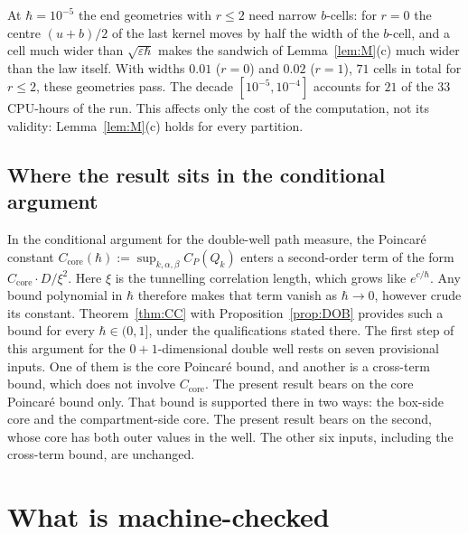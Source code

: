 \documentclass[11pt,a4paper]{article}
\theoremstyle{definition}
\theoremstyle{remark}
\begin{document}
At $\hbar=10^{-5}$ the end geometries with $r\le2$ need narrow $b$-cells: for $r=0$ the centre $(u+b)/2$ of the last kernel moves by half the width of the $b$-cell, and a cell much wider than $\sqrt{\varepsilon\hbar}$ makes the sandwich of Lemma~\ref{lem:M}(c) much wider than the law itself. With widths $0.01$ ($r=0$) and $0.02$ ($r=1$), $71$ cells in total for $r\le2$, these geometries pass. The decade $[10^{-5},10^{-4}]$ accounts for $21$ of the $33$ CPU-hours of the run. This affects only the cost of the computation, not its validity: Lemma~\ref{lem:M}(c) holds for every partition.

\subsection{Where the result sits in the conditional argument}\label{sec:conditional}
In the conditional argument for the double-well path measure, the Poincar\'e constant $C_{\mathrm{core}}(\hbar):=\sup_{k,\alpha,\beta}C_P(Q_k)$ enters a second-order term of the form $C_{\mathrm{core}}\cdot D/\xi^2$. Here $\xi$ is the tunnelling correlation length, which grows like $e^{c/\hbar}$. Any bound polynomial in $\hbar$ therefore makes that term vanish as $\hbar\to0$, however crude its constant. Theorem~\ref{thm:CC} with Proposition~\ref{prop:DOB} provides such a bound for every $\hbar\in(0,1]$, under the qualifications stated there. The first step of this argument for the $0+1$-dimensional double well rests on seven provisional inputs. One of them is the core Poincar\'e bound, and another is a cross-term bound, which does not involve $C_{\mathrm{core}}$. The present result bears on the core Poincar\'e bound only. That bound is supported there in two ways: the box-side core and the compartment-side core. The present result bears on the second, whose core has both outer values in the well. The other six inputs, including the cross-term bound, are unchanged.

\section{What is machine-checked}\label{sec:lean}
\end{document}
